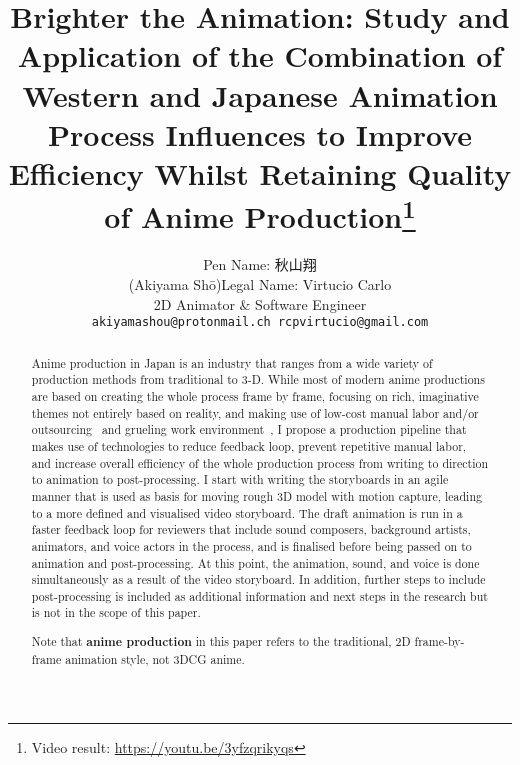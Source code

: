 \documentclass[10pt,twocolumn,letterpaper]{article}
\begin{document}

\title{Brighter the Animation: Study and Application of the Combination of Western and Japanese Animation Process Influences to Improve Efficiency Whilst Retaining Quality of Anime Production\thanks{Video result: \url{https://youtu.be/3yfzqrikyqs}}}

\author{\begin{CJK}{UTF8}{min}Pen Name: 秋山翔\end{CJK} (Akiyama Shō)\quad\quad Legal Name: Virtucio Carlo\\
2D Animator \& Software Engineer\\
{\tt\small akiyamashou@protonmail.ch \quad\quad rcpvirtucio@gmail.com}
}

\maketitle

\begin{abstract}

Anime production in Japan is an industry that ranges from a wide variety of production methods from traditional to 3-D. While most of modern anime productions are based on creating the whole process frame by frame, focusing on rich, imaginative themes not entirely based on reality, and making use of low-cost manual labor and/or outsourcing~\cite{animeIndustryAveSal,animatorJapanBrutal} and grueling work environment~\cite{animeCriminalLabor}, I propose a production pipeline that makes use of technologies to reduce feedback loop, prevent repetitive manual labor, and increase overall efficiency of the whole production process from writing to direction to animation to post-processing. I start with writing the storyboards in an agile manner that is used as basis for moving rough 3D model with motion capture, leading to a more defined and visualised video storyboard. The draft animation is run in a faster feedback loop for reviewers that include sound composers, background artists, animators, and voice actors in the process, and is finalised before being passed on to animation and post-processing. At this point, the animation, sound, and voice is done simultaneously as a result of the video storyboard. In addition, further steps to include post-processing is included as additional information and next steps in the research but is not in the scope of this paper.

Note that \textbf{anime production} in this paper refers to the traditional, 2D frame-by-frame animation style, not 3DCG anime.

\end{abstract}
\end{document}
